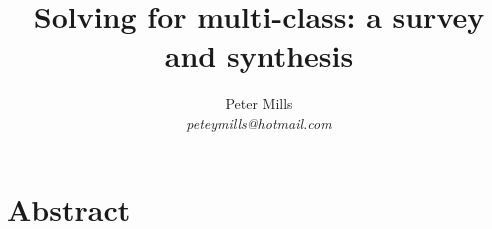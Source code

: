 \documentclass{article}
\begin{document}
\title{Solving for multi-class: a survey and synthesis}

\author{Peter Mills\\\textit{peteymills@hotmail.com}}

\maketitle

\section*{Abstract}



\tableofcontents





\end{document}
